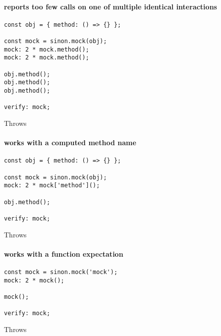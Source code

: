 \paragraph*{reports too few calls on one of multiple identical interactions}
\begin{verbatim}
const obj = { method: () => {} };

const mock = sinon.mock(obj);
mock: 2 * mock.method();
mock: 2 * mock.method();

obj.method();
obj.method();
obj.method();

verify: mock;
\end{verbatim}
Throws
\paragraph*{works with a computed method name}
\begin{verbatim}
const obj = { method: () => {} };

const mock = sinon.mock(obj);
mock: 2 * mock['method']();

obj.method();

verify: mock;
\end{verbatim}
Throws
\paragraph*{works with a function expectation}
\begin{verbatim}
const mock = sinon.mock('mock');
mock: 2 * mock();

mock();

verify: mock;
\end{verbatim}
Throws
